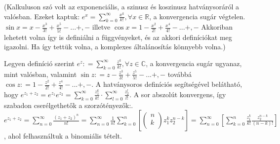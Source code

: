 \documentclass[12pt,a4paper]{scrartcl}
\begin{document}
(Kalkuluson szó volt az exponenciális, a szinusz és koszinusz
hatványsoráról a valósban. Ezeket kaptuk:
\(e^{x} = {\sum\limits_{k = 0}^{\infty}{\frac{x^{k}}{k!},\forall x \in {\mathbb{R}}}}\),
a konvergencia sugár végtelen.
\(\sin x = x - \frac{x^{3}}{3!} + \frac{x^{5}}{5!} - ... + , -\) illetve
\(\cos x = 1 - \frac{x^{2}}{2!} + \frac{x^{4}}{4!} - ... + , -\)
Akkoriban lehetett volna így is definiálni a függvényeket, és az akkori
definíciókat meg igazolni. Ha így tettük volna, a komplexes
általánosítás könnyebb volna.)

Legyen definíció szerint
\(e^{z}: = {\sum\limits_{k = 0}^{\infty}{\frac{z^{k}}{k!},\forall z \in {\mathbb{C}}}}\),
a konvergencia sugár ugyanaz, mint valósban, valamint
\(\sin z: = z - \frac{z^{3}}{3!} + \frac{z^{5}}{5!} - ... + , -\)
továbbá
\(\cos z: = 1 - \frac{z^{2}}{2!} + \frac{z^{4}}{4!} - ... + , -\). A
hatványsoros definíciós segítségével belátható, hogy
\(e^{z_{1} + z_{2}} = e^{z_{1}}e^{z_{2}} = {\sum\limits_{k = 0}^{\infty}\frac{z_{1}^{k}}{k!}} \cdot {\sum\limits_{l = 0}^{\infty}\frac{z_{2}^{l}}{l!}}\).
A sor abszolút konvergens, így szabadon cserélgethetők a
szorzótényezők:.
\(e^{z_{1} + z_{2}} = {\sum\limits_{n = 0}^{\infty}\frac{\left( {z_{1} + z_{2}} \right)^{n}}{n!}} = {\sum\limits_{n = 0}^{\infty}{\frac{1}{n!}{\sum\limits_{k = 0}^{n}\left\lbrack {\begin{pmatrix} n \\ k \\ \end{pmatrix}z_{1}^{k}z_{2}^{n - k}} \right\rbrack}}} = {\sum\limits_{n = 0}^{\infty}\left\lbrack {\sum\limits_{k = 0}^{n}{\frac{z_{1}^{k}}{k!}\frac{z_{2}^{n - k}}{\left( {n - k} \right)!}}} \right\rbrack}\),
ahol felhasználtuk a binomiális tételt.
\end{document}
